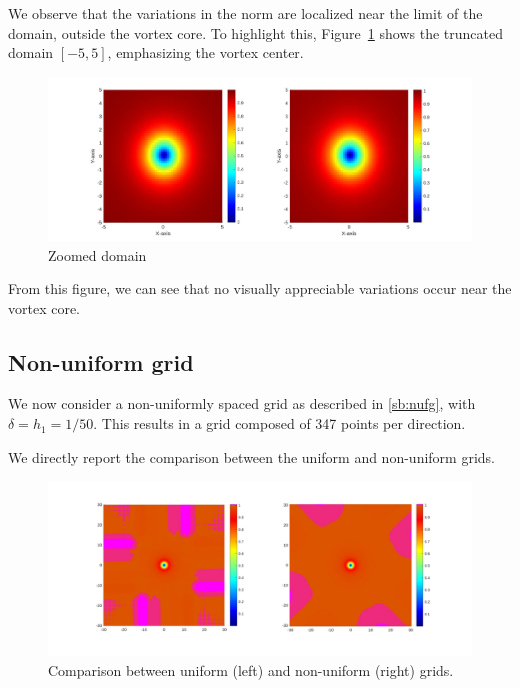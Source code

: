 We observe that the variations in the norm are localized near the limit of the domain, outside the vortex core. To highlight this, Figure~\ref{fig:vortex_center} shows the truncated domain $[-5,5]$, emphasizing the vortex center.

\begin{figure}[h!]
    \centering
    \includegraphics[width=\textwidth]{img/ltufd20t347s30L_5.pdf}
    \caption{Zoomed domain}
    \label{fig:vortex_center}
\end{figure}

From this figure, we can see that no visually appreciable variations occur near the vortex core.

\subsection{Non-uniform grid}

We now consider a non-uniformly spaced grid as described in \ref{sb:nufg}, with $\delta = h_1 = 1/50$. This results in a grid composed of 347 points per direction.

We directly report the comparison between the uniform and non-uniform grids.

\begin{figure}[h!]
    \centering
    \includegraphics[width=\textwidth]{img/comparison_unfd.pdf}
    \caption{Comparison between uniform (left) and non-uniform (right) grids.}
\end{figure}


